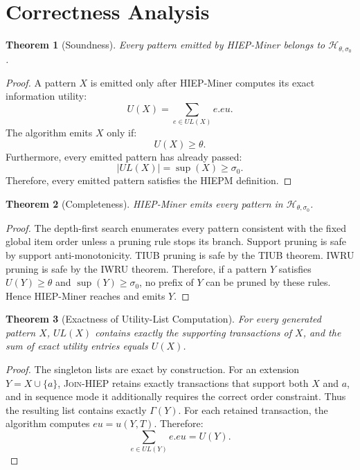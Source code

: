\documentclass[11pt,a4paper]{article}
\newtheorem{theorem}{Theorem}
\newcommand{\HIEP}{\mathcal{H}}
\newcommand{\supp}{\operatorname{sup}}
\begin{document}
\section{Correctness Analysis}

\begin{theorem}[Soundness]
Every pattern emitted by HIEP-Miner belongs to \(\HIEP_{\theta,\sigma_0}\).
\end{theorem}

\begin{proof}
A pattern \(X\) is emitted only after HIEP-Miner computes its exact information utility:
\[
U(X)=\sum_{e\in UL(X)}e.eu.
\]
The algorithm emits \(X\) only if:
\[
U(X)\ge\theta.
\]
Furthermore, every emitted pattern has already passed:
\[
|UL(X)|=\supp(X)\ge\sigma_0.
\]
Therefore, every emitted pattern satisfies the HIEPM definition.
\end{proof}

\begin{theorem}[Completeness]
HIEP-Miner emits every pattern in \(\HIEP_{\theta,\sigma_0}\).
\end{theorem}

\begin{proof}
The depth-first search enumerates every pattern consistent with the fixed global item order unless a pruning rule stops its branch. Support pruning is safe by support anti-monotonicity. TIUB pruning is safe by the TIUB theorem. IWRU pruning is safe by the IWRU theorem. Therefore, if a pattern \(Y\) satisfies \(U(Y)\ge\theta\) and \(\supp(Y)\ge\sigma_0\), no prefix of \(Y\) can be pruned by these rules. Hence HIEP-Miner reaches and emits \(Y\).
\end{proof}

\begin{theorem}[Exactness of Utility-List Computation]
For every generated pattern \(X\), \(UL(X)\) contains exactly the supporting transactions of \(X\), and the sum of exact utility entries equals \(U(X)\).
\end{theorem}

\begin{proof}
The singleton lists are exact by construction. For an extension \(Y=X\cup\{a\}\), \textsc{Join-HIEP} retains exactly transactions that support both \(X\) and \(a\), and in sequence mode it additionally requires the correct order constraint. Thus the resulting list contains exactly \(\Gamma(Y)\). For each retained transaction, the algorithm computes \(eu=u(Y,T)\). Therefore:
\[
\sum_{e\in UL(Y)}e.eu=U(Y).
\]
\end{proof}
\end{document}
